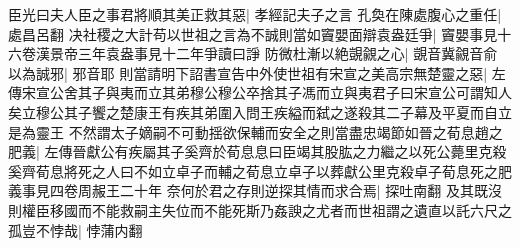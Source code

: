 臣光曰夫人臣之事君將順其美正救其惡|{
	孝經記夫子之言}
孔奐在陳處腹心之重任|{
	處昌呂翻}
决社稷之大計苟以世祖之言為不誠則當如竇嬰面辯袁盎廷爭|{
	竇嬰事見十六卷漢景帝三年袁盎事見十二年爭讀曰諍}
防微杜漸以絶覬覦之心|{
	覬音冀覦音俞}
以為誠邪|{
	邪音耶}
則當請明下詔書宣告中外使世祖有宋宣之美高宗無楚靈之惡|{
	左傳宋宣公舍其子與夷而立其弟穆公穆公卒捨其子馮而立與夷君子曰宋宣公可謂知人矣立穆公其子饗之楚康王有疾其弟圍入問王疾縊而弑之遂殺其二子幕及平夏而自立是為靈王}
不然謂太子嫡嗣不可動揺欲保輔而安全之則當盡忠竭節如晉之荀息趙之肥義|{
	左傳晉獻公有疾屬其子奚齊於荀息息曰臣竭其股肱之力繼之以死公薨里克殺奚齊荀息將死之人曰不如立卓子而輔之荀息立卓子以葬獻公里克殺卓子荀息死之肥義事見四卷周赧王二十年}
奈何於君之存則逆探其情而求合焉|{
	探吐南翻}
及其既沒則權臣移國而不能救嗣主失位而不能死斯乃姦諛之尤者而世祖謂之遺直以託六尺之孤豈不悖哉|{
	悖蒲内翻}


